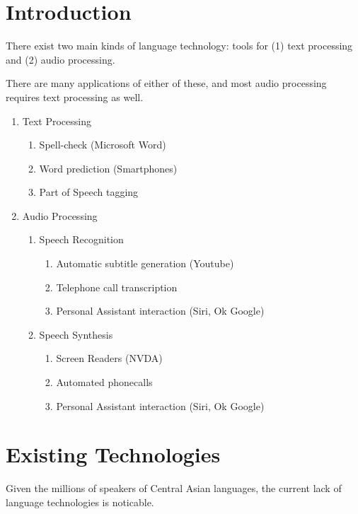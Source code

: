 \documentclass[12pt,a4paper]{article}
\begin{document}
\section{Introduction}

There exist two main kinds of language technology: tools for (1) text processing and (2) audio processing.

There are many applications of either of these, and most audio processing requires text processing as well.

\begin{enumerate}
\item Text Processing
  \begin{enumerate}
  \item Spell-check (Microsoft Word)
  \item Word prediction (Smartphones)
  \item Part of Speech tagging
  \end{enumerate}

\item Audio Processing
  \begin{enumerate}
  \item Speech Recognition
    \begin{enumerate}
    \item Automatic subtitle generation (Youtube)
    \item Telephone call transcription
    \item Personal Assistant interaction (Siri, Ok Google)
    \end{enumerate}

  \item Speech Synthesis
    \begin{enumerate}
    \item Screen Readers (NVDA)
    \item Automated phonecalls
    \item Personal Assistant interaction (Siri, Ok Google)
    \end{enumerate}
    
  \end{enumerate}

\end{enumerate}


\section{Existing Technologies}

Given the millions of speakers of Central Asian languages, the current lack of language technologies is noticable.
\end{document}
